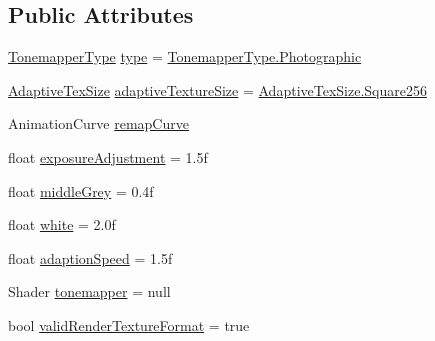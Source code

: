 \subsection*{Public Attributes}
\begin{DoxyCompactItemize}
\item 
\mbox{\hyperlink{class_unity_standard_assets_1_1_image_effects_1_1_tonemapping_abdf231516a590a7b08ef8503048a3d33}{Tonemapper\+Type}} \mbox{\hyperlink{class_unity_standard_assets_1_1_image_effects_1_1_tonemapping_a52e39b9f620d0f6b460858cdc4f38d54}{type}} = \mbox{\hyperlink{class_unity_standard_assets_1_1_image_effects_1_1_tonemapping_abdf231516a590a7b08ef8503048a3d33acf42c2415ddadee23605115458f767b4}{Tonemapper\+Type.\+Photographic}}
\item 
\mbox{\hyperlink{class_unity_standard_assets_1_1_image_effects_1_1_tonemapping_affa06af2bce28037fc1882c70b7b2131}{Adaptive\+Tex\+Size}} \mbox{\hyperlink{class_unity_standard_assets_1_1_image_effects_1_1_tonemapping_a4e2851e06546da666944b45c7f48b25a}{adaptive\+Texture\+Size}} = \mbox{\hyperlink{class_unity_standard_assets_1_1_image_effects_1_1_tonemapping_affa06af2bce28037fc1882c70b7b2131a6f3236873f8f65d77055d9963e4573bd}{Adaptive\+Tex\+Size.\+Square256}}
\item 
Animation\+Curve \mbox{\hyperlink{class_unity_standard_assets_1_1_image_effects_1_1_tonemapping_ab123af79fd32ac56e5940bda3060a5fc}{remap\+Curve}}
\item 
float \mbox{\hyperlink{class_unity_standard_assets_1_1_image_effects_1_1_tonemapping_a679f2b540067a1881357906f55b97405}{exposure\+Adjustment}} = 1.\+5f
\item 
float \mbox{\hyperlink{class_unity_standard_assets_1_1_image_effects_1_1_tonemapping_ac020f4984d972d696bb9399b9d7c39b6}{middle\+Grey}} = 0.\+4f
\item 
float \mbox{\hyperlink{class_unity_standard_assets_1_1_image_effects_1_1_tonemapping_af6e2802512825edfbe961a98e62a064e}{white}} = 2.\+0f
\item 
float \mbox{\hyperlink{class_unity_standard_assets_1_1_image_effects_1_1_tonemapping_a66ae33480c09153c1edd26b393f59b7b}{adaption\+Speed}} = 1.\+5f
\item 
Shader \mbox{\hyperlink{class_unity_standard_assets_1_1_image_effects_1_1_tonemapping_a81b4dff40a21bcaf1e409b5b2889549f}{tonemapper}} = null
\item 
bool \mbox{\hyperlink{class_unity_standard_assets_1_1_image_effects_1_1_tonemapping_a02b5dd547ece5aefb8a9ed3348b55fed}{valid\+Render\+Texture\+Format}} = true
\end{DoxyCompactItemize}
